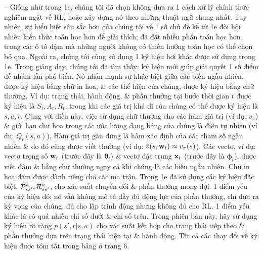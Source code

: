 \documentclass{article}
\begin{document}
\begin{itemize}
    -- Giống như trong 1e, chúng tôi đã chọn không đưa ra 1 cách xử lý chính thức nghiêm ngặt về RL, hoặc xây dựng nó theo những thuật ngữ chung nhất. Tuy nhiên, sự hiểu biết sâu sắc hơn của chúng tôi về 1 số chủ đề kể từ 1e đòi hỏi nhiều kiến thức toán học hơn để giải thích; đã đặt nhiều phần toán học hơn trong các ô tô đậm mà những người không có thiên hướng toán học có thể chọn bỏ qua. Ngoài ra, chúng tôi cũng sử dụng 1 ký hiệu hơi khác được sử dụng trong 1e. Trong giảng dạy, chúng tôi đã tìm thấy: ký hiệu mới giúp giải quyết 1 số điểm dễ nhầm lẫn phổ biến. Nó nhấn mạnh sự khác biệt giữa các biến ngẫu nhiên, được ký hiệu bằng chữ in hoa, \& các thể hiện của chúng, được ký hiệu bằng chữ thường. Ví dụ: trạng thái, hành động, \& phần thưởng tại bước thời gian $t$ được ký hiệu là $S_t,A_t,R_t$, trong khi các giá trị khả dĩ của chúng có thể được ký hiệu là $s,a,r$. Cùng với điều này, việc sử dụng chữ thường cho các hàm giá trị (ví dụ: $v_\pi$) \& giới hạn chữ hoa trong các ước lượng dạng bảng của chúng là điều tự nhiên (ví dụ: $Q_t(s,a)$). Hàm giá trị gần đúng là hàm xác định của các tham số ngẫu nhiên \& do đó cũng được viết thường (ví dụ: $\hat{v}(s,{\bf w}_t)\approx v_\pi(s)$). Các vectơ, ví dụ: vectơ trọng số ${\bf w}_t$ (trước đây là $\boldsymbol{\theta}_t$) \& vectơ đặc trưng ${\bf x}_t$ (trước đây là $\boldsymbol{\phi}_t$), được viết đậm \& bằng chữ thường ngay cả khi chúng là các biến ngẫu nhiên. Chữ in hoa đậm được dành riêng cho các ma trận. Trong 1e đã sử dụng các ký hiệu đặc biệt, ${\cal P}_{ss'}^a,{\cal R}_{ss'}^a$, cho xác suất chuyển đổi \& phần thưởng mong đợi. 1 điểm yếu của ký hiệu đó: nó vẫn không mô tả đầy đủ động lực của phần thưởng, chỉ đưa ra kỳ vọng của chúng, đủ cho lập trình động nhưng không đủ cho RL. 1 điểm yếu khác là có quá nhiều chỉ số dưới \& chỉ số trên. Trong phiên bản này, hãy sử dụng ký hiệu rõ ràng $p(s',r|s,a)$ cho xác suất kết hợp cho trạng thái tiếp theo \& phần thưởng dựa trên trạng thái hiện tại \& hành động. Tất cả các thay đổi về ký hiệu được tóm tắt trong bảng ở trang 6.


\end{itemize}
\end{document}
